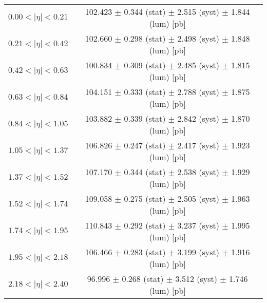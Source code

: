 \begin{tabular}{lc}
\hline
$0.00 < |\eta| <0.21$          & 102.423 $\pm$ 0.344 (stat) $\pm$ 2.515 (syst) $\pm$ 1.844 (lum) [pb]  \\
$0.21 < |\eta| <0.42$          & 102.660 $\pm$ 0.298 (stat) $\pm$ 2.498 (syst) $\pm$ 1.848 (lum) [pb]  \\
$0.42 < |\eta| <0.63$          & 100.834 $\pm$ 0.309 (stat) $\pm$ 2.485 (syst) $\pm$ 1.815 (lum) [pb]  \\
$0.63 < |\eta| <0.84$          & 104.151 $\pm$ 0.333 (stat) $\pm$ 2.788 (syst) $\pm$ 1.875 (lum) [pb]  \\
$0.84 < |\eta| <1.05$          & 103.882 $\pm$ 0.339 (stat) $\pm$ 2.842 (syst) $\pm$ 1.870 (lum) [pb]  \\
$1.05 < |\eta| <1.37$          & 106.826 $\pm$ 0.247 (stat) $\pm$ 2.417 (syst) $\pm$ 1.923 (lum) [pb]  \\
$1.37 < |\eta| <1.52$          & 107.170 $\pm$ 0.344 (stat) $\pm$ 2.538 (syst) $\pm$ 1.929 (lum) [pb]  \\
$1.52 < |\eta| <1.74$          & 109.058 $\pm$ 0.275 (stat) $\pm$ 2.505 (syst) $\pm$ 1.963 (lum) [pb]  \\
$1.74 < |\eta| <1.95$          & 110.843 $\pm$ 0.292 (stat) $\pm$ 3.237 (syst) $\pm$ 1.995 (lum) [pb]  \\
$1.95 < |\eta| <2.18$          & 106.466 $\pm$ 0.283 (stat) $\pm$ 3.199 (syst) $\pm$ 1.916 (lum) [pb]  \\
$2.18 < |\eta| <2.40$          & 96.996 $\pm$ 0.268 (stat) $\pm$ 3.512 (syst) $\pm$ 1.746 (lum) [pb]  \\
\hline
\end{tabular}
